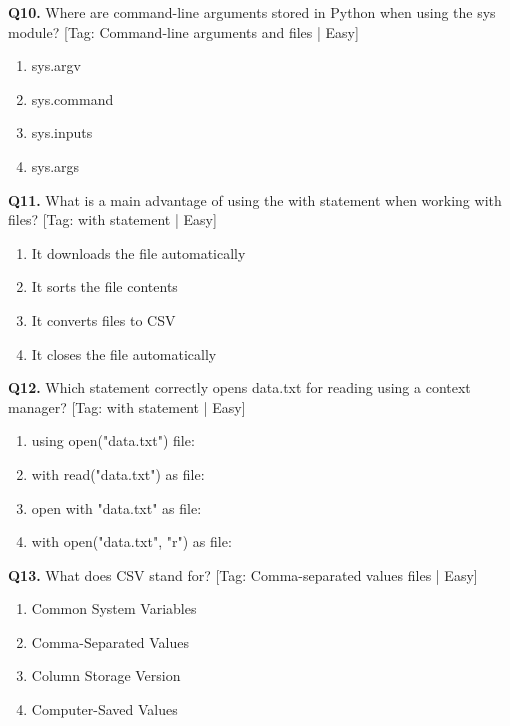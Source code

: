 \vspace{2mm}
\noindent\textbf{Q10.} Where are command-line arguments stored in Python when using the sys module? \hfill [Tag: Command-line arguments and files | Easy]
\begin{enumerate}[label=(\alph*),topsep=2pt,itemsep=1pt,partopsep=0pt,parsep=0pt]
    \item {sys.argv}
    \item {sys.command}
    \item {sys.inputs}
    \item {sys.args}
\end{enumerate}
\vspace{2mm}
\noindent\textbf{Q11.} What is a main advantage of using the with statement when working with files? \hfill [Tag: with statement | Easy]
\begin{enumerate}[label=(\alph*),topsep=2pt,itemsep=1pt,partopsep=0pt,parsep=0pt]
    \item {It downloads the file automatically}
    \item {It sorts the file contents}
    \item {It converts files to CSV}
    \item {It closes the file automatically}
\end{enumerate}
\vspace{2mm}
\noindent\textbf{Q12.} Which statement correctly opens data.txt for reading using a context manager? \hfill [Tag: with statement | Easy]
\begin{enumerate}[label=(\alph*),topsep=2pt,itemsep=1pt,partopsep=0pt,parsep=0pt]
    \item {using open("data.txt") file:}
    \item {with read("data.txt") as file:}
    \item {open with "data.txt" as file:}
    \item {with open("data.txt", "r") as file:}
\end{enumerate}
\vspace{2mm}
\noindent\textbf{Q13.} What does CSV stand for? \hfill [Tag: Comma-separated values files | Easy]
\begin{enumerate}[label=(\alph*),topsep=2pt,itemsep=1pt,partopsep=0pt,parsep=0pt]
    \item {Common System Variables}
    \item {Comma-Separated Values}
    \item {Column Storage Version}
    \item {Computer-Saved Values}
\end{enumerate}
